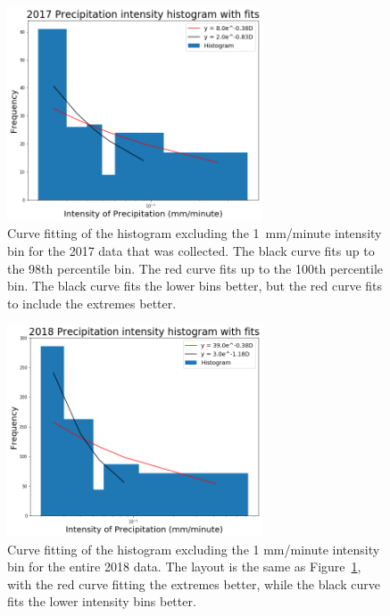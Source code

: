 \documentclass[11pt]{report}
\begin{document}
\clearpage
\begin{figure}[t]
  \centering
  \includegraphics[width=0.675\textwidth]{Figures/inten2017_fit.png}
  \caption[Fitting Intensity histogram for 2017 with different bins]
          {\label{i2017_fit}Curve fitting of the histogram excluding the
            1~mm/minute intensity bin for the 2017 data that was
            collected. The black curve fits up to the 98th percentile
            bin. The red curve fits up to the 100th percentile bin. The
            black curve fits the lower bins better, but the red curve fits
            to include the extremes better.  }
\end{figure}

\begin{figure}[b]
  \centering
  \includegraphics[width=0.675\textwidth]{Figures/inten2018_fit.png}
  \caption[Fitting Intensity histogram for 2018 with different bins]
          {\label{i2018_fit}Curve fitting of the histogram excluding the 1
            mm/minute intensity bin for the entire 2018 data. The layout is
            the same as Figure~\ref{i2017_fit}, with the red curve fitting
            the extremes better, while the black curve fits the lower
            intensity bins better.}
\end{figure}
\end{document}
